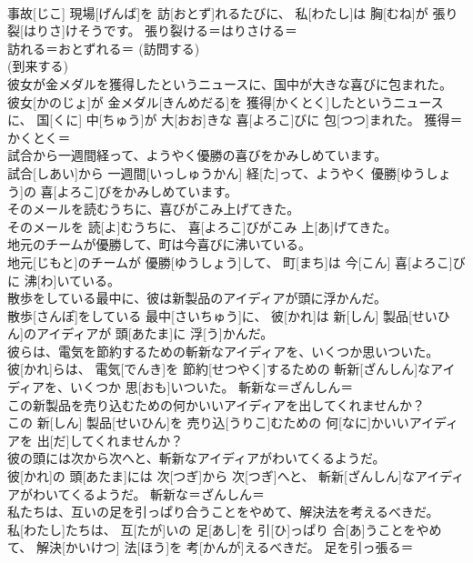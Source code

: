 \documentclass[8pt]{extreport}
\begin{document}
\begin{CJK}{UTF8}{min}
\\	事故[じこ] 現場[げんば]を 訪[おとず]れるたびに、 私[わたし]は 胸[むね]が 張り裂[はりさ]けそうです。	張り裂ける＝はりさける＝ 
\\	訪れる＝おとずれる＝ (訪問する) 
\\	(到来する) 
\\	彼女が金メダルを獲得したというニュースに、国中が大きな喜びに包まれた。	
\\	彼女[かのじょ]が 金メダル[きんめだる]を 獲得[かくとく]したというニュースに、 国[くに] 中[ちゅう]が 大[おお]きな 喜[よろこ]びに 包[つつ]まれた。	獲得＝かくとく＝ 
\\	試合から一週間経って、ようやく優勝の喜びをかみしめています。	
\\	試合[しあい]から 一週間[いっしゅうかん] 経[た]って、ようやく 優勝[ゆうしょう]の 喜[よろこ]びをかみしめています。	
\\	そのメールを読むうちに、喜びがこみ上げてきた。	
\\	そのメールを 読[よ]むうちに、 喜[よろこ]びがこみ 上[あ]げてきた。	
\\	地元のチームが優勝して、町は今喜びに沸いている。	
\\	地元[じもと]のチームが 優勝[ゆうしょう]して、 町[まち]は 今[こん] 喜[よろこ]びに 沸[わ]いている。	
\\	散歩をしている最中に、彼は新製品のアイディアが頭に浮かんだ。	
\\	散歩[さんぽ]をしている 最中[さいちゅう]に、 彼[かれ]は 新[しん] 製品[せいひん]のアイディアが 頭[あたま]に 浮[う]かんだ。	
\\	彼らは、電気を節約するための斬新なアイディアを、いくつか思いついた。	
\\	彼[かれ]らは、 電気[でんき]を 節約[せつやく]するための 斬新[ざんしん]なアイディアを、いくつか 思[おも]いついた。	斬新な＝ざんしん＝ 
\\	この新製品を売り込むための何かいいアイディアを出してくれませんか？	
\\	この 新[しん] 製品[せいひん]を 売り込[うりこ]むための 何[なに]かいいアイディアを 出[だ]してくれませんか？	
\\	彼の頭には次から次へと、斬新なアイディアがわいてくるようだ。	
\\	彼[かれ]の 頭[あたま]には 次[つぎ]から 次[つぎ]へと、 斬新[ざんしん]なアイディアがわいてくるようだ。	斬新な＝ざんしん＝ 
\\	私たちは、互いの足を引っぱり合うことをやめて、解決法を考えるべきだ。	
\\	私[わたし]たちは、 互[たが]いの 足[あし]を 引[ひ]っぱり 合[あ]うことをやめて、 解決[かいけつ] 法[ほう]を 考[かんが]えるべきだ。	足を引っ張る＝ 

\end{CJK}
\end{document}
